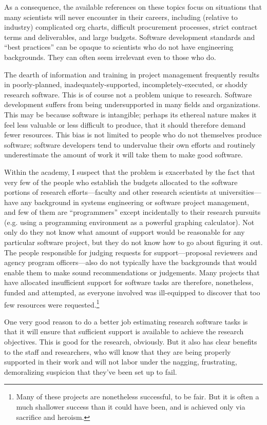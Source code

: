 \documentclass[12pt,oneside]{book}
\begin{document}
As a consequence, the available references on these topics focus on situations that many scientists will never encounter in their careers, including (relative to industry) complicated org charts, difficult procurement processes, strict contract terms and deliverables, and large budgets. Software development standards
and ``best practices'' can be opaque to scientists who do not have engineering backgrounds. They can often seem irrelevant even to those who do.

The dearth of information and training in project management frequently results in poorly-planned, inadequately-supported, incompletely-executed, or shoddy research software. This is of course not a problem unique to research. Software development suffers from being undersupported in many fields and organizations. This may be because software is intangible; perhaps its ethereal nature makes it feel less valuable or less difficult to produce, that it should therefore demand fewer resources. This bias is not limited to people who do not themselves produce software; software developers tend to undervalue their own efforts and routinely underestimate the amount of work it will take them to make good software.

Within the academy, I suspect that the problem is exacerbated by the fact that very few of the people who establish the budgets allocated to the software portions of research efforts---faculty and other research scientists at universities---have any background in systems engineering or software project management, and few of them are ``programmers'' except incidentally to their research pursuits (e.g. using a programming environment as a powerful graphing calculator). Not only do they not know what amount of support would be reasonable for any particular software project, but they do not know how to go about figuring it out. The people responsible for judging requests for support---proposal reviewers and agency program officers---also do not typically have the backgrounds that would enable them to make sound recommendations or judgements. Many projects that have allocated insufficient support for software tasks are therefore, nonetheless, funded and attempted, as everyone involved was ill-equipped to discover that too few resources were requested.\footnote{
Many of these projects are nonetheless successful, to be fair. But it is often a much shallower success than it could have been, and is achieved only via sacrifice and heroism.}

One very good reason to do a better job estimating research software tasks is that it will ensure that sufficient support is available to achieve the research objectives. This is good for the research, obviously. But it also has clear benefits to the staff and researchers, who will know that they are being properly supported in their work and will not labor under the nagging, frustrating, demoralizing suspicion that they've been set up to fail.
\end{document}
